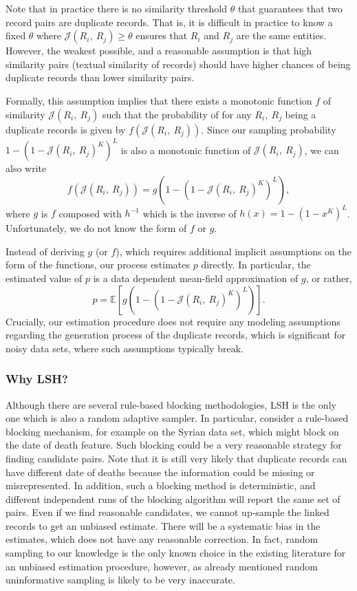 \documentclass[aoas]{imsart}
\begin{document}
Note that in practice there is no similarity threshold $\theta$ that guarantees that two record pairs are duplicate records. That is, it is difficult in practice to know a fixed $\theta$ where $\mathcal{J}(R_i,\ R_j) \ge \theta$ ensures that $R_i$ and $R_j$ are the same entities. However, the weakest possible, and a reasonable assumption is that high similarity pairs (textual similarity of records) should have higher chances of being duplicate records than lower similarity pairs.

Formally, this assumption implies that there exists a monotonic function $f$ of similarity $\mathcal{J}(R_i,\ R_j)$ such that the probability of for any $R_i, \ R_j$ being a duplicate records is given by $f(\mathcal{J}(R_i,\ R_j))$.  Since our sampling probability $1-(1-\mathcal{J}(R_i,\ R_j)^K)^L$ is also a monotonic function of $\mathcal{J}(R_i,\ R_j)$, we can also write $$f(\mathcal{J}(R_i,\ R_j)) = g(1-(1-\mathcal{J}(R_i,\ R_j)^K)^L),$$ where $g$ is $f$ composed with $h^{-1}$ which is the inverse of $h(x) = 1-(1-x^K)^L$. Unfortunately, we do not know the form of $f$ or $g$.

Instead of deriving $g$ (or $f$), which requires additional implicit assumptions on the form of the functions, our process estimates $p$ directly. In particular, the estimated value of $p$ is a data dependent mean-field approximation of $g$, or  rather, $$p = \mathbb{E}[g(1-(1-\mathcal{J}(R_i,\ R_j)^K)^L)].$$ Crucially, our estimation procedure does not require any modeling assumptions regarding the generation process of the duplicate records, which is significant for noisy data sets, where such assumptions typically break.


\subsubsection{Why LSH?}
\label{sec:WHYLSH}
Although there are several rule-based blocking methodologies, LSH is the only one which is also a random adaptive sampler. In particular, consider a rule-based blocking mechanism, for example on the Syrian data set, which might block on the date of death feature. Such blocking could be a very reasonable strategy for finding candidate pairs. Note that it is still very likely that duplicate records can have different date of deaths because the information could be missing or misrepresented.  In addition, such a blocking method is deterministic, and different independent runs of the blocking algorithm will report the same set of pairs. Even if we find reasonable candidates, we cannot up-sample the linked records to get an unbiased estimate. There will be a systematic bias in the estimates, which does not have any reasonable correction. In fact, random sampling to our knowledge is the only known choice in the existing literature for an unbiased estimation procedure, however, as already mentioned random uninformative sampling is likely to be very inaccurate.
\end{document}
